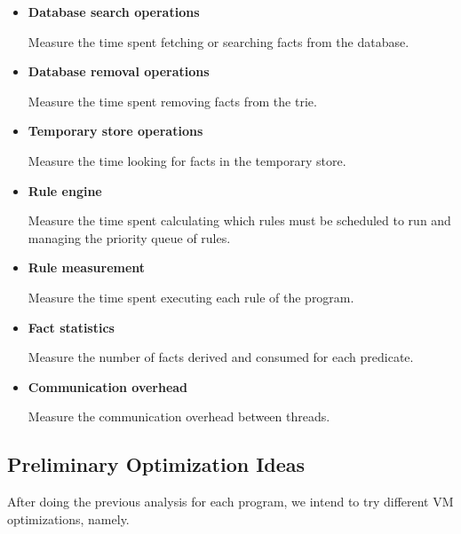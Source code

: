 \begin{itemize}
   \item \textbf{Database search operations}
   
   Measure the time spent fetching or searching facts from the database. 
   
   \item \textbf{Database removal operations}
   
   Measure the time spent removing facts from the trie.
   
   \item \textbf{Temporary store operations}
   
   Measure the time looking for facts in the temporary store.
   
   \item \textbf{Rule engine}
   
   Measure the time spent calculating which rules must be scheduled to run and managing the priority queue of rules.
   
   \item \textbf{Rule measurement}
   
   Measure the time spent executing each rule of the program.
   
   \item \textbf{Fact statistics}
   
   Measure the number of facts derived and consumed for each predicate.
   
   \item \textbf{Communication overhead}
   
   Measure the communication overhead between threads.
   
\end{itemize}

\subsection{Preliminary Optimization Ideas}

After doing the previous analysis for each \lang program, we intend to try different VM optimizations, namely.

